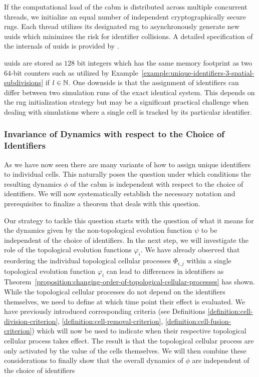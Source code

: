 \begin{example}
    If the computational load of the \ac{cabm} is distributed across multiple concurrent threads,
    we initialize an equal number of independent cryptographically secure \acp{rng}.
    Each thread utilizes its designated \ac{rng} to asynchronously generate new \acp{uuid} which
    minimizes the risk for identifier collisions.
    A detailed specification of the internals of \acp{uuid} is provided by \parencite{Davis2024}.
    \label{example:unique-identifiers-4-uuids}
\end{example}

\acp{uuid} are stored as $128$ bit integers which has the same memory footprint as two $64$-bit
counters such as utilized by Example~\ref{example:unique-identifiers-3-spatial-subdivisions} if
$l\in\mathbb{N}$.
One downside is that the assignment of identifiers can differ between two simulation runs of the
exact identical system.
This depends on the \ac{rng} initialization strategy but may be a significant practical challenge
when dealing with simulations where a single cell is tracked by its particular identifier.

\subsubsection{Invariance of Dynamics with respect to the Choice of Identifiers}
As we have now seen there are many variants of how to assign unique identifiers to individual cells.
This naturally poses the question under which conditions the resulting dynamics $\phi$ of the
\ac{cabm} is independent with respect to the choice of identifiers.
We will now systematically establish the necessary notation and prerequisites to finalize a theorem
that deals with this question.

Our strategy to tackle this question starts with the question of what it means for the dynamics
given by the non-topological evolution function $\psi$ to be independent of the choice of
identifiers.
In the next step, we will investigate the role of the topological evolution functions $\varphi_i$.
We have already observed that reordering the individual topological cellular processes $\Phi_{i,j}$
within a single topological evolution function $\varphi_i$ can lead to differences in identifiers as
Theorem~\ref{proposition:changing-order-of-topological-cellular-processes} has shown.
While the topological cellular processes do not depend on the identifiers themselves, we need to
define at which time point their effect is evaluated.
We have previously introduced corresponding criteria (see Definitions
\ref{definition:cell-division-criterion}, \ref{definition:cell-removal-criterion},
\ref{definition:cell-fusion-criterion}) which will now be used to indicate when their respective
topological cellular process takes effect.
The result is that the topological cellular process are only activated by the value of the cells
themselves.
We will then combine these considerations to finally show that the overall dynamics of $\phi$ are
independent of the choice of identifiers

